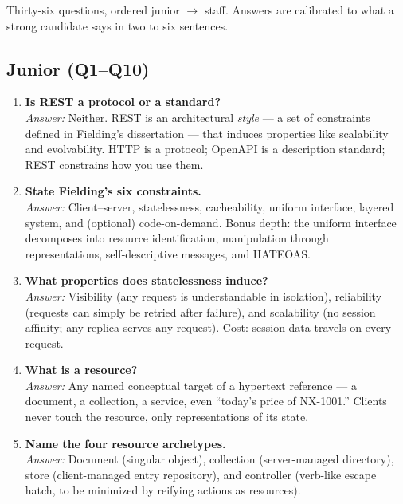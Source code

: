 Thirty-six questions, ordered junior $\rightarrow$ staff. Answers are calibrated
to what a strong candidate says in two to six sentences.

\subsection{Junior (Q1--Q10)}

\begin{enumerate}[label=\textbf{Q\arabic*.}, leftmargin=3.2em, itemsep=0.6em]
  \item \textbf{Is REST a protocol or a standard?}\\
        \emph{Answer:} Neither. REST is an architectural \emph{style} --- a set
        of constraints defined in Fielding's dissertation
        \cite{fielding2000rest} --- that induces properties like scalability
        and evolvability. HTTP is a protocol; OpenAPI is a description
        standard; REST constrains how you use them.
  \item \textbf{State Fielding's six constraints.}\\
        \emph{Answer:} Client--server, statelessness, cacheability, uniform
        interface, layered system, and (optional) code-on-demand. Bonus depth:
        the uniform interface decomposes into resource identification,
        manipulation through representations, self-descriptive messages, and
        HATEOAS.
  \item \textbf{What properties does statelessness induce?}\\
        \emph{Answer:} Visibility (any request is understandable in isolation),
        reliability (requests can simply be retried after failure), and
        scalability (no session affinity; any replica serves any request).
        Cost: session data travels on every request.
  \item \textbf{What is a resource?}\\
        \emph{Answer:} Any named conceptual target of a hypertext reference ---
        a document, a collection, a service, even ``today's price of NX-1001.''
        Clients never touch the resource, only representations of its state.
  \item \textbf{Name the four resource archetypes.}\\
        \emph{Answer:} Document (singular object), collection (server-managed
        directory), store (client-managed entry repository), and controller
        (verb-like escape hatch, to be minimized by reifying actions as
        resources).

\end{enumerate}
